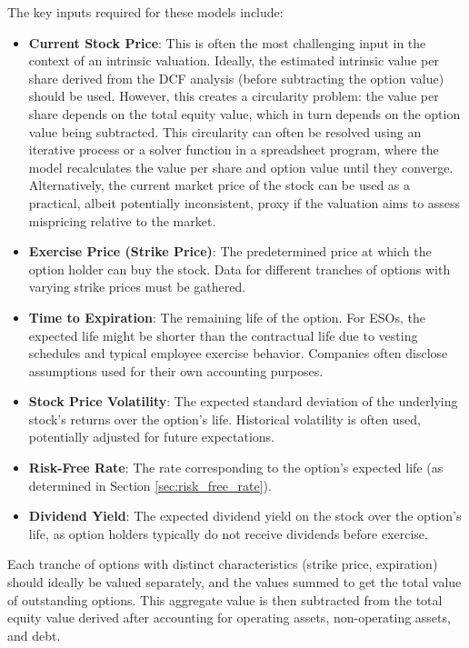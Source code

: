 The key inputs required for these models include:
\begin{itemize}
    \item \textbf{Current Stock Price}: This is often the most challenging input in the context of an intrinsic valuation. Ideally, the estimated intrinsic value per share derived from the DCF analysis (before subtracting the option value) should be used. However, this creates a circularity problem: the value per share depends on the total equity value, which in turn depends on the option value being subtracted. This circularity can often be resolved using an iterative process or a solver function in a spreadsheet program, where the model recalculates the value per share and option value until they converge. Alternatively, the current market price of the stock can be used as a practical, albeit potentially inconsistent, proxy if the valuation aims to assess mispricing relative to the market.
    \item \textbf{Exercise Price (Strike Price)}: The predetermined price at which the option holder can buy the stock. Data for different tranches of options with varying strike prices must be gathered.
    \item \textbf{Time to Expiration}: The remaining life of the option. For ESOs, the expected life might be shorter than the contractual life due to vesting schedules and typical employee exercise behavior. Companies often disclose assumptions used for their own accounting purposes.
    \item \textbf{Stock Price Volatility}: The expected standard deviation of the underlying stock's returns over the option's life. Historical volatility is often used, potentially adjusted for future expectations.
    \item \textbf{Risk-Free Rate}: The rate corresponding to the option's expected life (as determined in Section \ref{sec:risk_free_rate}).
    \item \textbf{Dividend Yield}: The expected dividend yield on the stock over the option's life, as option holders typically do not receive dividends before exercise.
\end{itemize}

Each tranche of options with distinct characteristics (strike price, expiration) should ideally be valued separately, and the values summed to get the total value of outstanding options. This aggregate value is then subtracted from the total equity value derived after accounting for operating assets, non-operating assets, and debt.

